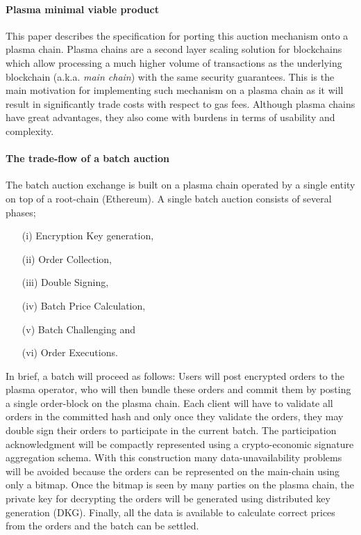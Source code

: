 \documentclass[11pt,parskip=full]{scrartcl}%
\begin{document}
\paragraph{Plasma minimal viable product}

This paper describes the specification for porting this auction mechanism onto a plasma chain. Plasma chains are a second layer scaling solution for blockchains which allow processing a much higher volume of transactions as the underlying blockchain (a.k.a. \emph{main chain}) with the same security guarantees. This is the main motivation for implementing such mechanism on a plasma chain as it will result in significantly trade costs with respect to gas fees. Although plasma chains have great advantages, they also come with burdens in terms of usability and complexity.

\paragraph{The trade-flow of a batch auction}  

The batch auction exchange is built on a plasma chain operated by a single entity on top of a root-chain (Ethereum). A single batch auction consists of several phases;
\begin{itemize}
\item[(i)] Encryption Key generation, 
\item[(ii)] Order Collection, 
\item[(iii)] Double Signing, 
\item[(iv)] Batch Price Calculation, 
\item[(v)] Batch Challenging and 
\item[(vi)] Order Executions. 
\end{itemize}
In brief, a batch will proceed as follows: Users will post encrypted orders to the plasma operator, who will then bundle these orders and commit them by posting a single order-block on the plasma chain. Each client will have to validate all orders in the committed hash and only once they validate the orders, they may double sign their orders to participate in the current batch. The participation acknowledgment will be compactly represented using a crypto-economic signature aggregation schema. With this construction many data-unavailability problems will be avoided because the orders can be represented on the main-chain using only a bitmap.
Once the bitmap is seen by many parties on the plasma chain, the private key for decrypting the orders will be generated using distributed key generation (DKG). Finally, all the data is available to calculate correct prices from the orders and the batch can be settled. 
\end{document}
